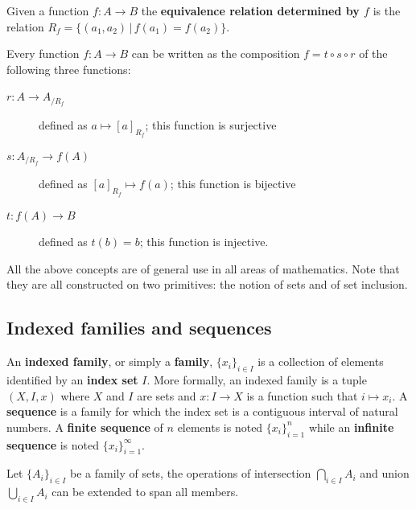 \documentclass{bareminimum}
\begin{document}
\begin{defn}
	Given a function $f : A \to B$ the \textbf{equivalence relation determined by $f$} is the relation $R_f = \{ (a_1, a_2) \, | \, f(a_1) = f(a_2) \}$.
\end{defn}

\begin{prop}
	Every function $f : A \to B$ can be written as the composition $f = t \circ s \circ r$ of the following three functions:
	\begin{description}
		\item[$r : A \to A_{/R_f}$] defined as $a \mapsto [a]_{R_f}$; this function is surjective
		\item[$s : A_{/R_f} \to f(A)$] defined as $[a]_{R_f} \mapsto f(a)$; this function is bijective
		\item[$t : f(A) \to B$] defined as $t(b) = b$; this function is injective.
	\end{description}
\end{prop}

\begin{remark}
	All the above concepts are of general use in all areas of mathematics. Note that they are all constructed on two primitives: the notion of sets and of set inclusion.
\end{remark}

\subsection{Indexed families and sequences}

\begin{defn}[Families]
	An \textbf{indexed family},  or simply a \textbf{family}, $\{x_i\}_{i \in I}$ is a collection of elements identified by an \textbf{index set} $I$. More formally, an indexed family is a tuple $( X, I, x )$ where $X$ and $I$ are sets and $x: I \to X$ is a function such that $i \mapsto x_i$. A \textbf{sequence} is a family for which the index set is a contiguous interval of natural numbers. A \textbf{finite sequence} of $n$ elements is noted $\{x_i\}_{i=1}^{n}$ while an \textbf{infinite sequence} is noted $\{x_i\}_{i=1}^{\infty}$.
\end{defn}

\begin{defn}
	Let $\{A_i\}_{i \in I}$  be a family of sets, the operations of intersection $\bigcap\limits_{i \in I} A_i $ and union $\bigcup\limits_{i \in I} A_i$ can be extended to span all members.
\end{defn}
\end{document}
